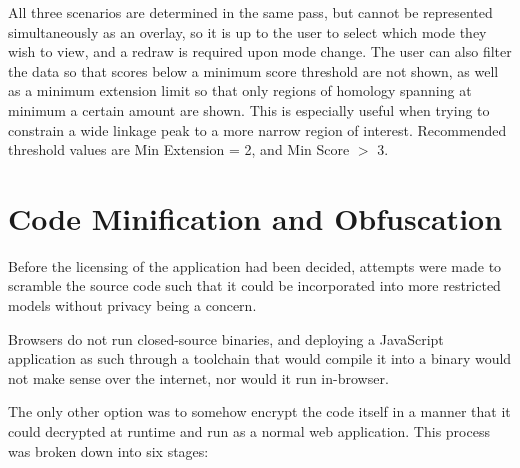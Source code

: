All three scenarios are determined in the same pass, but cannot be represented simultaneously as an overlay, so it is up to the user to select which mode they wish to view, and a redraw is required upon mode change.  The user can also filter the data so that scores below a minimum score threshold are not shown, as well as a minimum extension limit so that only regions of homology spanning at minimum a certain amount are shown. This is especially useful when trying to constrain  a wide linkage peak to a more narrow region of interest. Recommended threshold values are Min Extension = 2, and Min Score $>$ 3.

\section{Code Minification and Obfuscation}
\label{ref:haplo:codeobf}

Before the licensing of the application had been decided, attempts were made to scramble the source code such that it could be incorporated into more restricted models without privacy being a concern.

Browsers do not run closed-source binaries, and deploying a JavaScript application as such through a toolchain that would compile it into a binary would not make sense over the internet, nor would it run in-browser.

The only other option was to somehow encrypt the code itself in a manner that it could decrypted at runtime and run as a normal web application. This process was broken down into six stages:

